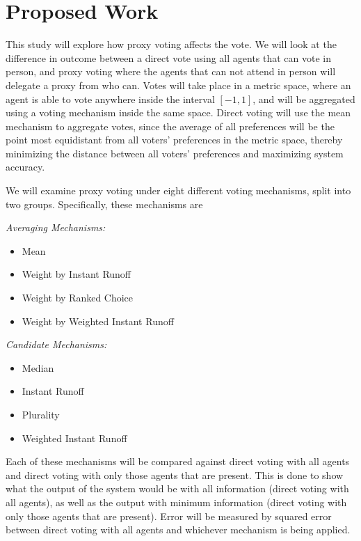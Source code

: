 \section{Proposed Work}\label{sec:contribution}
This study will explore how proxy voting affects the vote.
We will look at the difference in outcome between a direct vote using all agents that
can vote in person, and proxy voting where the agents that can not attend in person
will delegate a proxy from who can.
Votes will take place in a metric space, where an agent is able to vote anywhere
inside the interval $[-1, 1]$, and will be aggregated using a voting mechanism inside
the same space.
Direct voting will use the mean mechanism to aggregate votes, since the average of
all preferences will be the point most equidistant from all voters' preferences in
the metric space, thereby minimizing the distance between all voters' preferences and
maximizing system accuracy.

We will examine proxy voting under eight different voting mechanisms, split into two
groups.
Specifically, these mechanisms are\\
\begin{samepage}
    \textit{Averaging Mechanisms:}
    \begin{itemize}
        \item Mean
        \item Weight by Instant Runoff
        \item Weight by Ranked Choice
        \item Weight by Weighted Instant Runoff
    \end{itemize}
    \textit{Candidate Mechanisms:}
    \begin{itemize}
        \item Median
        \item Instant Runoff
        \item Plurality
        \item Weighted Instant Runoff
    \end{itemize}
\end{samepage}
Each of these mechanisms will be compared against direct voting with all agents and
direct voting with only those agents that are present.
This is done to show what the output of the system would be with all information
(direct voting with all agents), as well as the output with minimum information
(direct voting with only those agents that are present).
Error will be measured by squared error between direct voting with all agents and
whichever mechanism is being applied.

